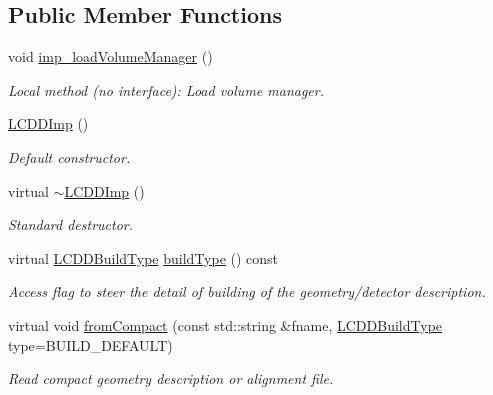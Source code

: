 \subsection*{Public Member Functions}
\begin{DoxyCompactItemize}
\item 
void \hyperlink{class_d_d4hep_1_1_geometry_1_1_l_c_d_d_imp_af1c734df7d03b3e7903e1c25c508d153}{imp\_\-loadVolumeManager} ()
\begin{DoxyCompactList}\small\item\em Local method (no interface): Load volume manager. \item\end{DoxyCompactList}\item 
\hyperlink{class_d_d4hep_1_1_geometry_1_1_l_c_d_d_imp_ac9cfc0155701a769a74fcf67d58d8749}{LCDDImp} ()
\begin{DoxyCompactList}\small\item\em Default constructor. \item\end{DoxyCompactList}\item 
virtual \hyperlink{class_d_d4hep_1_1_geometry_1_1_l_c_d_d_imp_a75a7b388970a2f18f79a8eddbc451411}{$\sim$LCDDImp} ()
\begin{DoxyCompactList}\small\item\em Standard destructor. \item\end{DoxyCompactList}\item 
virtual \hyperlink{namespace_d_d4hep_acafe43ba4537ab6e999e808142965fab}{LCDDBuildType} \hyperlink{class_d_d4hep_1_1_geometry_1_1_l_c_d_d_imp_ab38d01be5ddf4db043ea23a77b04a21a}{buildType} () const 
\begin{DoxyCompactList}\small\item\em Access flag to steer the detail of building of the geometry/detector description. \item\end{DoxyCompactList}\item 
virtual void \hyperlink{class_d_d4hep_1_1_geometry_1_1_l_c_d_d_imp_a4eb2edfae225abead99a6cd6a85e84f7}{fromCompact} (const std::string \&fname, \hyperlink{namespace_d_d4hep_acafe43ba4537ab6e999e808142965fab}{LCDDBuildType} type=BUILD\_\-DEFAULT)
\begin{DoxyCompactList}\small\item\em Read compact geometry description or alignment file. \item\end{DoxyCompactList}\item 

\end{DoxyCompactItemize}
